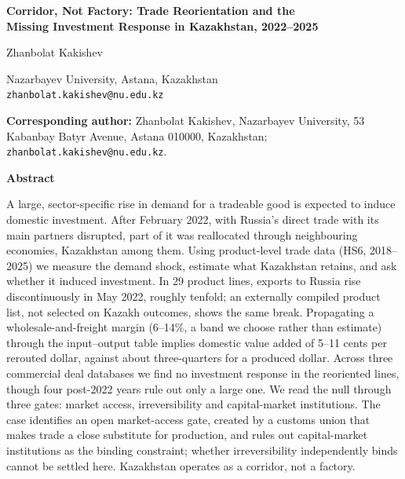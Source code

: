 \documentclass[12pt]{article}
\begin{document}
\begin{center}
{\LARGE\bfseries Corridor, Not Factory: Trade Reorientation and the\\[2pt]
Missing Investment Response in Kazakhstan, 2022--2025\par}
\end{center}

\vspace{1.5em}

\begin{center}
{\large Zhanbolat Kakishev\par}
\vspace{0.5em}
Nazarbayev University, Astana, Kazakhstan\\
\texttt{zhanbolat.kakishev@nu.edu.kz}
\end{center}

\vspace{0.5em}

\begin{center}
\textbf{Corresponding author:} Zhanbolat Kakishev, Nazarbayev University,
53 Kabanbay Batyr Avenue, Astana 010000, Kazakhstan; \texttt{zhanbolat.kakishev@nu.edu.kz}.
\end{center}

\vspace{1.5em}

\begin{center}\textbf{Abstract}\end{center}
\noindent A large, sector-specific rise in demand for a tradeable good is expected to induce
domestic investment. After February 2022, with Russia's direct trade with its main partners
disrupted, part of it was reallocated through neighbouring economies, Kazakhstan among them.
Using product-level trade data (HS6, 2018--2025) we measure the demand shock, estimate what
Kazakhstan retains, and ask whether it induced investment. In 29 product lines, exports to
Russia rise discontinuously in May 2022, roughly tenfold; an externally compiled product list,
not selected on Kazakh outcomes, shows the same break. Propagating a wholesale-and-freight
margin (6--14\%, a band we choose rather than estimate) through the input--output table
implies domestic value added of 5--11 cents per rerouted dollar, against about three-quarters
for a produced dollar. Across three commercial deal databases we find no investment response
in the reoriented lines, though four post-2022 years rule out only a large one. We read the
null through three gates: market access, irreversibility and capital-market institutions. The
case identifies an open market-access gate, created by a customs union that makes trade a
close substitute for production, and rules out capital-market institutions as the binding
constraint; whether irreversibility independently binds cannot be settled here. Kazakhstan
operates as a corridor, not a factory.
\end{document}
